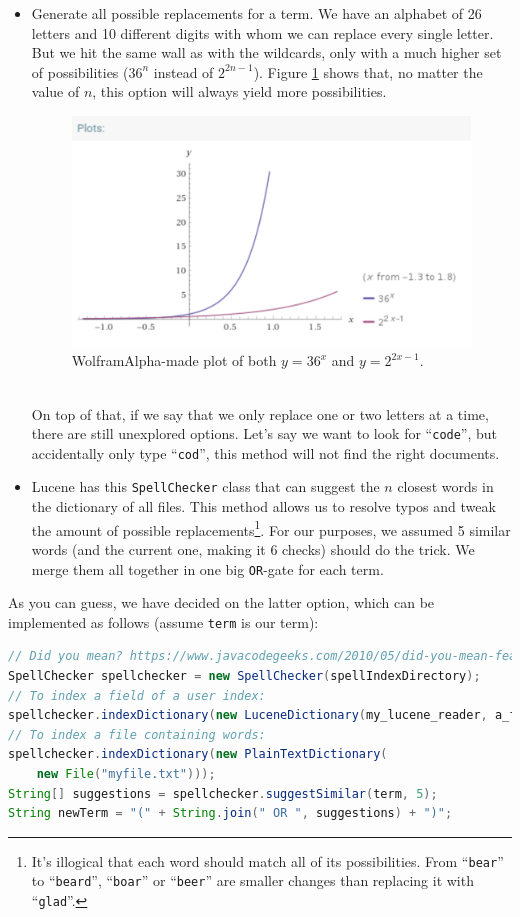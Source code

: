 \documentclass[11pt]{article}
\begin{document}
\begin{itemize}
    \item Generate all possible replacements for a term. We have an alphabet of 26 letters and 10 different digits with whom we can replace every single letter. But we hit the same wall as with the wildcards, only with a much higher set of possibilities ($36^{n}$ instead of $2^{2n-1}$). Figure \ref{fig:wa} shows that, no matter the value of $n$, this option will always yield more possibilities.
    \begin{figure}[h!]
        \centering
        \includegraphics[width=.75\textwidth]{images/plots.eps}
        \caption{WolframAlpha-made plot of both $y=36^{x}$ and $y=2^{2x-1}$.}
        \label{fig:wa}
    \end{figure}\\
    On top of that, if we say that we only replace one or two letters at a time, there are still unexplored options. Let's say we want to look for ``\texttt{code}'', but accidentally only type ``\texttt{cod}'', this method will not find the right documents.
    \item Lucene has this \texttt{SpellChecker} class that can suggest the $n$ closest words in the dictionary of all files. This method allows us to resolve typos and tweak the amount of possible replacements\footnote{It's illogical that each word should match all of its possibilities. From ``\texttt{bear}'' to ``\texttt{beard}'', ``\texttt{boar}'' or ``\texttt{beer}'' are smaller changes than replacing it with ``\texttt{glad}''.}. For our purposes, we assumed 5 similar words (and the current one, making it 6 checks) should do the trick. We merge them all together in one big \texttt{OR}-gate for each term.
\end{itemize}
As you can guess, we have decided on the latter option, which can be implemented as follows (assume \texttt{term} is our term):
\begin{lstlisting}[language=Java]
// Did you mean? https://www.javacodegeeks.com/2010/05/did-you-mean-feature-lucene-spell.html
SpellChecker spellchecker = new SpellChecker(spellIndexDirectory);
// To index a field of a user index:
spellchecker.indexDictionary(new LuceneDictionary(my_lucene_reader, a_field));
// To index a file containing words:
spellchecker.indexDictionary(new PlainTextDictionary(
    new File("myfile.txt")));
String[] suggestions = spellchecker.suggestSimilar(term, 5);
String newTerm = "(" + String.join(" OR ", suggestions) + ")";
\end{lstlisting}
\end{document}
